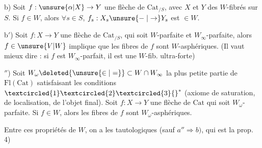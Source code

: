 b) Soit $f:\unsure{\alpha|X}\to Y$ une flèche de $\mathrm{Cat}_{/S}$, avec $X$ et $Y$ des $W$-fibrés sur $S$. Si $f\in W$, alors $\forall s\in S$, $f_s:X_s\unsure{\mathrel{-}|\to}Y_s$ est $\in W$.

b$'$) Soit $f:X\to Y$ une flèche de $\mathrm{Cat}_{/S}$, qui soit  $W$-parfaite et $W_\infty$-parfaite,  alors $f\in\unsure{V|W}$ implique que les fibres de $f$ sont $W$-asphériques. (Il vaut mieux dire : si $f$ est $W_\infty$-parfait, il est une $W$-fib. ultra-forte)


$''$) Soit $W_\omega\deleted{\unsure{\in|=}}\subset W\cap W_\infty$ la plus petite partie de $\mathrm{Fl}(\mathrm{Cat})$ satisfaisant les conditions $\textcircled{1}\textcircled{2}\textcircled{3}{}^*$ (axiome de saturation, de localisation, de l'objet final). Soit $f:X\to Y$ une flèche de $\mathrm{Cat}$ qui soit $W_\omega$-parfaite. Si $f\in W$, alors les fibres de $f$ sont $W_\omega$-asphériques.


Entre ces propriétés de $W$, on a les  tautologiques (sauf $a''\Rightarrow b)$, qui est  la prop. 4)



